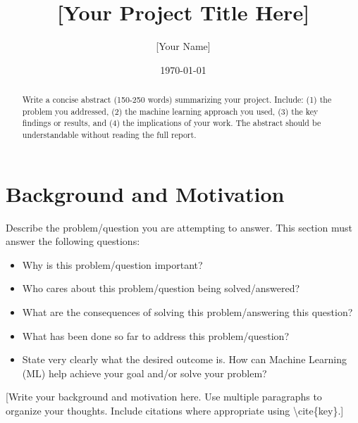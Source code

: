 \documentclass[aps,prl,preprint,groupedaddress]{revtex4-2}
\begin{document}
\title{[Your Project Title Here]}

\author{[Your Name]}

\date{\today}

\begin{abstract}
Write a concise abstract (150-250 words) summarizing your project. Include: (1) the problem you addressed, (2) the machine learning approach you used, (3) the key findings or results, and (4) the implications of your work. The abstract should be understandable without reading the full report.
\end{abstract}

\maketitle

\section{Background and Motivation}
\label{sec:background}

Describe the problem/question you are attempting to answer. This section must answer the following questions:

\begin{itemize}
    \item Why is this problem/question important?
    \item Who cares about this problem/question being solved/answered?
    \item What are the consequences of solving this problem/answering this question?
    \item What has been done so far to address this problem/question?
    \item State very clearly what the desired outcome is. How can Machine Learning (ML) help achieve your goal and/or solve your problem?
\end{itemize}

[Write your background and motivation here. Use multiple paragraphs to organize your thoughts. Include citations where appropriate using \textbackslash cite\{key\}.]

\end{document}
